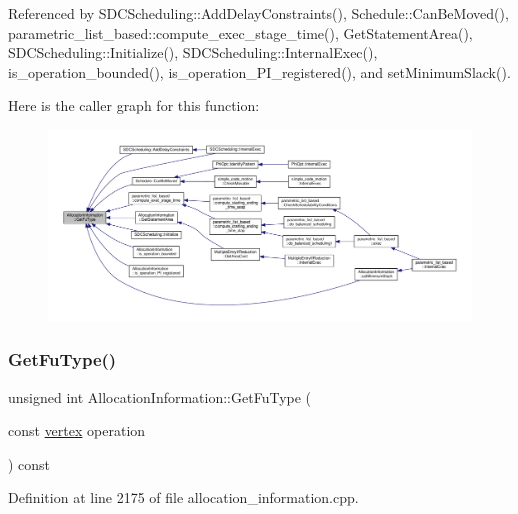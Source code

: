 Referenced by S\+D\+C\+Scheduling\+::\+Add\+Delay\+Constraints(), Schedule\+::\+Can\+Be\+Moved(), parametric\+\_\+list\+\_\+based\+::compute\+\_\+exec\+\_\+stage\+\_\+time(), Get\+Statement\+Area(), S\+D\+C\+Scheduling\+::\+Initialize(), S\+D\+C\+Scheduling\+::\+Internal\+Exec(), is\+\_\+operation\+\_\+bounded(), is\+\_\+operation\+\_\+\+P\+I\+\_\+registered(), and set\+Minimum\+Slack().

Here is the caller graph for this function\+:
\nopagebreak
\begin{figure}[H]
\begin{center}
\leavevmode
\includegraphics[width=350pt]{d7/d79/classAllocationInformation_aa65644e624477a27fe4288d30b88e627_icgraph}
\end{center}
\end{figure}
\mbox{\label{classAllocationInformation_aa0b3108baa944921bb25dbf1f5516245}} 
\subsubsection{\texorpdfstring{Get\+Fu\+Type()}{GetFuType()}\hspace{0.1cm}{\footnotesize\ttfamily [2/2]}}
{\footnotesize\ttfamily unsigned int Allocation\+Information\+::\+Get\+Fu\+Type (\begin{DoxyParamCaption}\item[{const \hyperlink{graph_8hpp_abefdcf0544e601805af44eca032cca14}{vertex}}]{operation }\end{DoxyParamCaption}) const}



Definition at line 2175 of file allocation\+\_\+information.\+cpp.

\mbox{\label{classAllocationInformation_a3c65f1874a9c81a9aeaaa81867dfc2d0}} 
